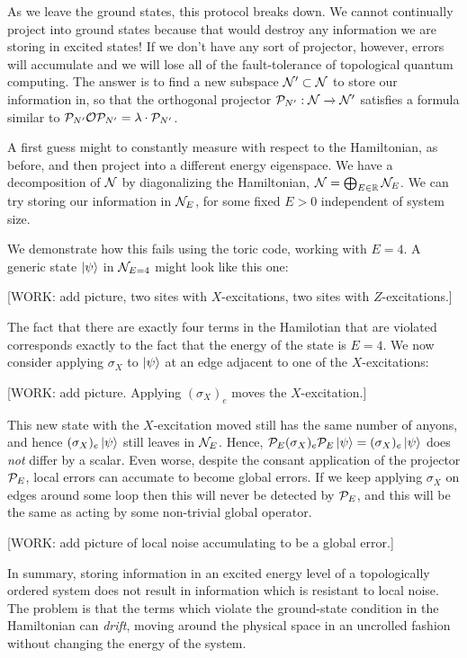 As we leave the ground states, this protocol breaks down. We cannot continually project into ground states because that would destroy any information we are storing in excited states! If we don't have any sort of projector, however, errors will accumulate and we will lose all of the fault-tolerance of topological quantum computing. The answer is to find a new subspace $\mathcal{N}' \subset \mathcal{N}$ to store our information in, so that the orthogonal projector $\mathcal{P}_{N'}: \mathcal{N} \xrightarrow{} \mathcal{N}'$ satisfies a formula similar to $\mathcal{P}_{N'}\mathcal{O} \mathcal{P}_{N'}=\lambda\cdot \mathcal{P}_{N'}$.

A first guess might to constantly measure with respect to the Hamiltonian, as before, and then project into a different energy eigenspace. We have a decomposition of $\mathcal{N}$ by diagonalizing the Hamiltonian, $\mathcal{N}=\bigoplus_{E\in \mathbb{R}}\mathcal{N}_{E}$. We can try storing our information in $\mathcal{N}_{E}$, for some fixed $E>0$ independent of system size.

We demonstrate how this fails using the toric code, working with $E=4$. A generic state $\ket{\psi}$ in $\mathcal{N}_{E=4}$ might look like this one:

[WORK: add picture, two sites with $X$-excitations, two sites with $Z$-excitations.]

The fact that there are exactly four terms in the Hamilotian that are violated corresponds exactly to the fact that the energy of the state is $E=4$. We now consider applying $\sigma_{X}$ to $\ket{\psi}$ at an edge adjacent to one of the $X$-excitations:

[WORK: add picture. Applying $(\sigma_X)_e$ moves the $X$-excitation.]

This new state with the $X$-excitation moved still has the same number of anyons, and hence $(\sigma_X)_e\ket{\psi}$ still leaves in $\mathcal{N}_{E}$. Hence, $\mathcal{P}_{E}(\sigma_X)_e\mathcal{P}_{E}\ket{\psi}=(\sigma_X)_e\ket{\psi}$ does \textit{not} differ by a scalar. Even worse, despite the consant application of the projector $\mathcal{P}_{E}$, local errors can accumate to become global errors. If we keep applying $\sigma_X$ on edges around some loop then this will never be detected by $\mathcal{P}_{E}$, and this will be the same as acting by some non-trivial global operator. 

[WORK: add picture of local noise accumulating to be a global error.]

In summary, storing information in an excited energy level of a topologically ordered system does not result in information which is resistant to local noise. The problem is that the terms which violate the ground-state condition in the Hamiltonian can \textit{drift}, moving around the physical space in an uncrolled fashion without changing the energy of the system.

